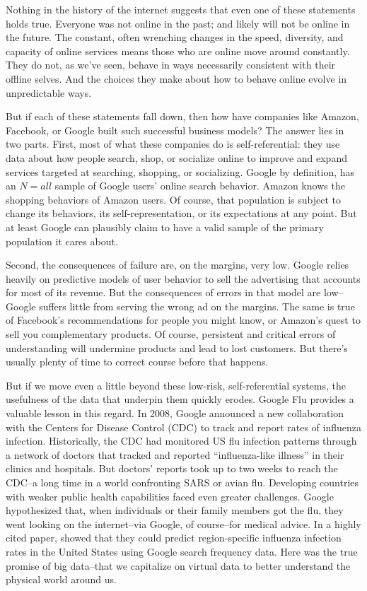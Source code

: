 \documentclass[12pt]{article}
\begin{document}
Nothing in the history of the internet suggests that even one of
these statements holds true. Everyone was not online in the past; and
likely will not be online in the future. The constant, often
wrenching changes in the speed, diversity, and capacity of online
services means those who are online move around constantly. They do
not, as we've seen, behave in ways necessarily consistent with their
offline selves. And the choices they make about how to behave online
evolve in unpredictable ways. 

But if each of these statements fall down, then how have companies
like Amazon, Facebook, or Google built such successful business
models? The answer lies in two parts. First, most of what these
companies do is self-referential: they use data about how people
search, shop, or socialize online to improve and expand services
targeted at searching, shopping, or socializing. Google by definition,
has an $N=all$ sample of Google users' online search
behavior. Amazon knows the shopping behaviors of Amazon users. Of
course, that population is subject to change its behaviors, its
self-representation, or its expectations at any point. But at least
Google can plausibly claim to have a valid sample of the primary
population it cares about. 

Second, the consequences of failure are, on the margins, very
low. Google relies heavily on predictive models of user behavior to
sell the advertising that accounts for most of its revenue. But the
consequences of errors in that model are low--Google suffers little
from serving the wrong ad on the margins. The same is true of
Facebook's recommendations for people you might know, or Amazon's
quest to sell you complementary products. Of course, persistent and
critical errors of understanding will undermine products and lead to
lost customers. But there's usually plenty of time to correct course
before that happens. 

But if we move even a little beyond these low-risk, self-referential
systems, the usefulness of the data that underpin them quickly
erodes. Google Flu provides a valuable lesson in this regard. In 2008,
Google announced a new collaboration with the Centers for Disease
Control (CDC) to track and report rates of influenza
infection. Historically, the CDC had monitored US flu infection
patterns through a network of doctors that tracked and reported
``influenza-like illness'' in their clinics and hospitals. But
doctors' reports took up to two weeks to reach the CDC--a long time in
a world confronting SARS or avian flu. Developing countries with
weaker public health capabilities faced even greater
challenges. Google hypothesized that, when individuals or their family
members got the flu, they went looking on the internet--via Google, of
course--for medical advice. In a highly cited paper,
\cite{ginsberg2008detecting} showed that they could predict
region-specific influenza infection rates in the United States using
Google search frequency data. Here was the true promise of big
data--that we capitalize on virtual data to better understand the
physical world around us.
\end{document}
